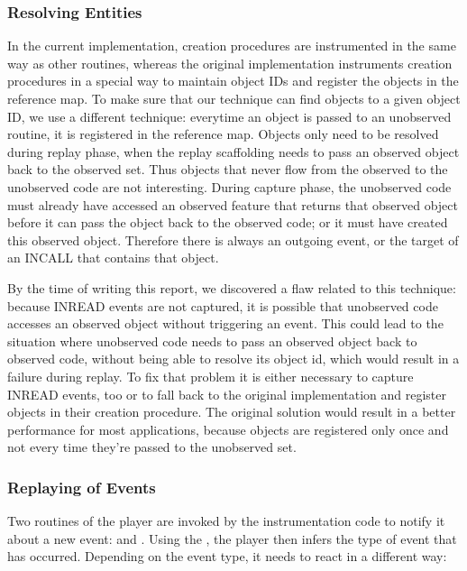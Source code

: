\subsubsection {Resolving Entities}
\label{lbl:entity_resolving}
In the current implementation, creation procedures are instrumented in the same way as other routines, whereas the original implementation instruments creation procedures in a special way to maintain object IDs and register the objects in the reference map. To make sure that our technique can find objects to a given object ID, we use a different technique: everytime an object is passed to an unobserved routine, it is registered in the reference map. Objects only need to be resolved during replay phase, when the replay scaffolding needs to pass an observed object back to the observed set. Thus objects that never flow from the observed to the unobserved code are not interesting. During capture phase, the unobserved code must already have accessed an observed feature that returns that observed object before it can pass the object back to the observed code; or it must have created this observed object.
Therefore there is always an outgoing event, or the target of an INCALL that contains that object.

By the time of writing this report, we discovered a flaw related to this technique: because INREAD events are not captured, it is possible that unobserved code accesses an observed object without triggering an event. This could lead to the situation where unobserved code needs to pass an observed object back to observed code, without being able to resolve its object id, which would result in a failure during replay. To fix that problem it is either necessary to capture INREAD events, too or to fall back to the original implementation and register objects in their creation procedure. The original solution would result in a better performance for most applications, because objects are registered only once and not every time they're passed to the unobserved set.


\subsubsection{Replaying of Events}
Two routines of the player are invoked by the instrumentation code to notify it about a new event:  and . Using the , the player then infers the type of event that has occurred. Depending on the event type, it needs to react in a different way:

